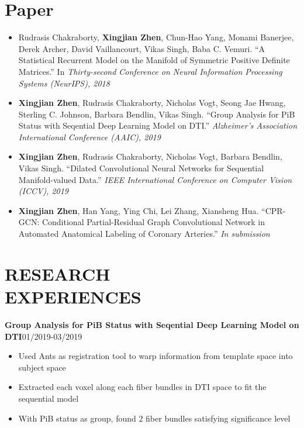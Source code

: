 \documentclass[margin]{res}
\begin{document}
\begin{resume}
\section{Paper}
                \begin{itemize}\itemsep -2.2pt
                \item Rudrasis Chakraborty, \textbf{Xingjian Zhen}, Chun-Hao Yang, Monami Banerjee, Derek Archer, David Vaillancourt, Vikas Singh, Baba C. Vemuri. ``A Statistical Recurrent Model on the Manifold of Symmetric Positive Definite Matrices.''  In \emph{Thirty-second Conference on Neural Information Processing Systems (NeurIPS), 2018}
                \item \textbf{Xingjian Zhen}, Rudrasis Chakraborty, Nicholas Vogt, Seong Jae Hwang, Sterling C. Johnson, Barbara Bendlin, Vikas Singh. ``Group Analysis for PiB Status with Seqential Deep Learning Model on DTI.'' \emph{Alzheimer's Association International Conference (AAIC), 2019}
                \item \textbf{Xingjian Zhen}, Rudrasis Chakraborty, Nicholas Vogt, Barbara Bendlin, Vikas Singh. ``Dilated Convolutional Neural Networks for Sequential Manifold-valued Data.'' \emph{IEEE International Conference on Computer Vision (ICCV), 2019}
                \item \textbf{Xingjian Zhen}, Han Yang, Ying Chi, Lei Zhang, Xiansheng Hua. ``CPR-GCN: Conditional Partial-Residual Graph Convolutional Network in Automated Anatomical Labeling of Coronary Arteries.'' \emph{In submission} 
                \end{itemize}

\section{RESEARCH \\ EXPERIENCES}

                \textbf{Group Analysis for PiB Status with Seqential Deep Learning Model on DTI}\hfill 01/2019-03/2019
                \begin{itemize}\itemsep -2.2pt %
                 \item Used Ants as registration tool to warp information from template space into subject space 
                 \item Extracted each voxel along each fiber bundles in DTI space to fit the sequential model
                 \item With PiB status as group, found 2 fiber bundles satisfying significance level
                 \end{itemize}


\end{resume}
\end{document}

